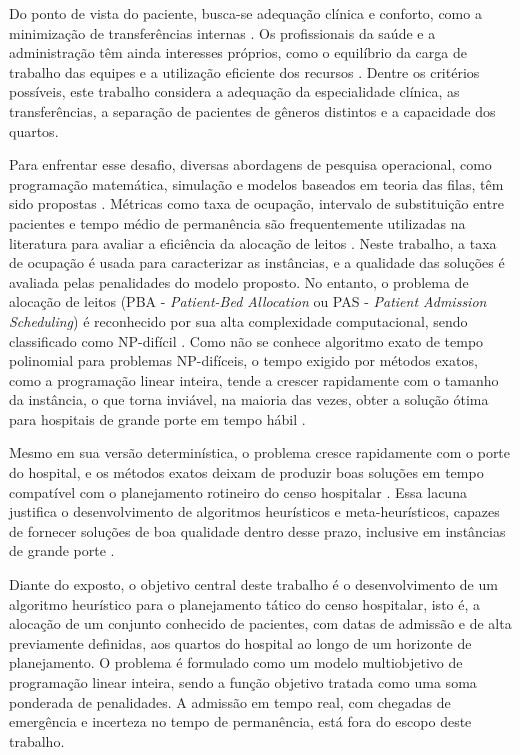 Do ponto de vista do paciente, busca-se adequação clínica e conforto, como a minimização de transferências internas \cite{schafer2023combining}. Os profissionais da saúde e a administração têm ainda interesses próprios, como o equilíbrio da carga de trabalho das equipes e a utilização eficiente dos recursos \cite{ceschia2011local, demeester2010hybrid, schafer2023combining}. Dentre os critérios possíveis, este trabalho considera a adequação da especialidade clínica, as transferências, a separação de pacientes de gêneros distintos e a capacidade dos quartos.

Para enfrentar esse desafio, diversas abordagens de pesquisa operacional, como programação matemática, simulação e modelos baseados em teoria das filas, têm sido propostas \cite{brandeau2004operations, he2019systematic}. Métricas como taxa de ocupação, intervalo de substituição entre pacientes e tempo médio de permanência são frequentemente utilizadas na literatura para avaliar a eficiência da alocação de leitos \cite{he2019systematic}. Neste trabalho, a taxa de ocupação é usada para caracterizar as instâncias, e a qualidade das soluções é avaliada pelas penalidades do modelo proposto.
No entanto, o problema de alocação de leitos (PBA - \textit{Patient-Bed Allocation} ou PAS - \textit{Patient Admission Scheduling}) é reconhecido por sua alta complexidade computacional, sendo classificado como NP-difícil \cite{ceschia2012modeling, demeester2010hybrid, schafer2023combining}. Como não se conhece algoritmo exato de tempo polinomial para problemas NP-difíceis, o tempo exigido por métodos exatos, como a programação linear inteira, tende a crescer rapidamente com o tamanho da instância, o que torna inviável, na maioria das vezes, obter a solução ótima para hospitais de grande porte em tempo hábil \cite{ceschia2012modeling, demeester2010hybrid}.

Mesmo em sua versão determinística, o problema cresce rapidamente com o porte do hospital, e os métodos exatos deixam de produzir boas soluções em tempo compatível com o planejamento rotineiro do censo hospitalar \cite{ceschia2012modeling, demeester2010hybrid}. Essa lacuna justifica o desenvolvimento de algoritmos heurísticos e meta-heurísticos, capazes de fornecer soluções de boa qualidade dentro desse prazo, inclusive em instâncias de grande porte \cite{demeester2010hybrid, talbi2009metaheuristics}.

Diante do exposto, o objetivo central deste trabalho é o desenvolvimento de um algoritmo heurístico para o planejamento tático do censo hospitalar, isto é, a alocação de um conjunto conhecido de pacientes, com datas de admissão e de alta previamente definidas, aos quartos do hospital ao longo de um horizonte de planejamento. O problema é formulado como um modelo multiobjetivo de programação linear inteira, sendo a função objetivo tratada como uma soma ponderada de penalidades. A admissão em tempo real, com chegadas de emergência e incerteza no tempo de permanência, está fora do escopo deste trabalho.

